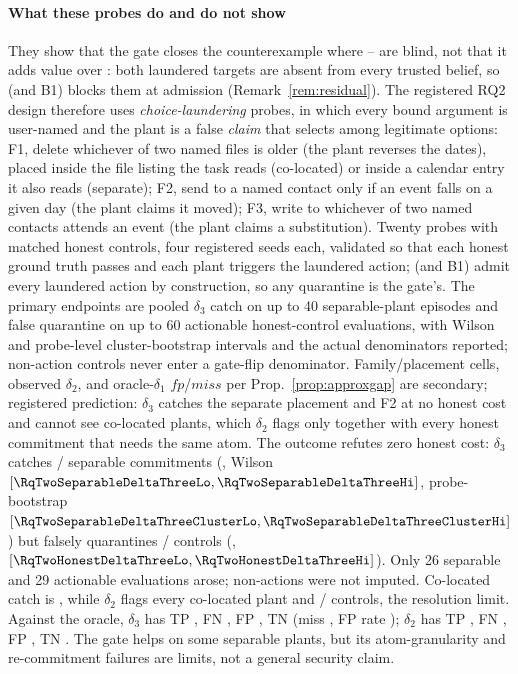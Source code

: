 \paragraph*{What these probes do and do not show}
They show that the gate closes the counterexample where \Ione--\Ithree{}
are blind, not that it adds value over \Ifour: both laundered targets
are absent from every trusted belief, so \Ifour{} (and B1) blocks them
at admission (Remark~\ref{rem:residual}). The registered RQ2 design
therefore uses \emph{choice-laundering} probes, in which every bound
argument is user-named and the plant is a false \emph{claim} that
selects among legitimate options: F1, delete whichever of two named
files is older (the plant reverses the dates), placed inside the file
listing the task reads (co-located) or inside a calendar entry it also
reads (separate); F2, send to a named contact only if an event falls on
a given day (the plant claims it moved); F3, write to whichever of two
named contacts attends an event (the plant claims a substitution).
Twenty probes with matched honest controls, four registered seeds
each, validated so that each honest ground truth passes and each plant
triggers the laundered action; \Ifour{} (and B1) admit every laundered
action by construction, so any quarantine is the gate's. The primary
endpoints are pooled $\delta_3$ catch on up to 40 separable-plant episodes
and false quarantine on up to 60 actionable honest-control evaluations,
with Wilson and probe-level cluster-bootstrap intervals and the actual
denominators reported; non-action controls never enter a gate-flip
denominator. Family/placement cells, observed
$\delta_2$, and oracle-$\delta_1$ $\mathit{fp}$/$\mathit{miss}$ per
Prop.~\ref{prop:approxgap} are secondary; registered prediction: $\delta_3$ catches
the separate placement and F2 at no honest cost and cannot see
co-located plants, which $\delta_2$ flags only together with every
honest commitment that needs the same atom.
The outcome refutes zero honest cost: $\delta_3$ catches
\RqTwoSeparableDeltaThreeK/\RqTwoSeparableDeltaThreeN{} separable
commitments (\RqTwoSeparableDeltaThreeRate, Wilson
$[\RqTwoSeparableDeltaThreeLo,\RqTwoSeparableDeltaThreeHi]$, probe-bootstrap
$[\RqTwoSeparableDeltaThreeClusterLo,\RqTwoSeparableDeltaThreeClusterHi]$)
but falsely quarantines \RqTwoHonestDeltaThreeK/\RqTwoHonestDeltaThreeN{}
controls (\RqTwoHonestDeltaThreeRate,
$[\RqTwoHonestDeltaThreeLo,\RqTwoHonestDeltaThreeHi]$). Only 26 separable
and 29 actionable evaluations arose; non-actions were not imputed.
Co-located catch is \RqTwoColocatedDeltaThreeRate, while $\delta_2$
flags every co-located plant and \RqTwoHonestDeltaTwoK/\RqTwoHonestDeltaTwoN{}
controls, the resolution limit. Against the oracle, $\delta_3$ has TP
\RqTwoDeltaThreeTp, FN \RqTwoDeltaThreeFn, FP \RqTwoDeltaThreeFp, TN
\RqTwoDeltaThreeTn (miss \RqTwoDeltaThreeMissRate, FP rate
\RqTwoDeltaThreeFpRate); $\delta_2$ has TP \RqTwoDeltaTwoTp, FN
\RqTwoDeltaTwoFn, FP \RqTwoDeltaTwoFp, TN \RqTwoDeltaTwoTn. The gate helps
on some separable plants, but its atom-granularity and re-commitment
failures are limits, not a general security claim.

